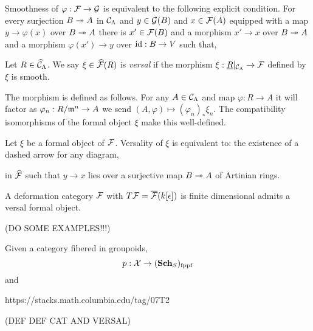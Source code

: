 \documentclass[12pt]{article}
\begin{document}
\begin{lemma}
Smoothness of $\varphi : \mathcal{F} \to \mathcal{G}$ is equivalent to the following explicit condition. For every surjection $B \twoheadrightarrow A$ in $\mathcal{C}_{\Lambda}$ and $y \in \mathcal{G}(B)$ and $x \in \mathcal{F}(A)$ equipped with a map $y \to \varphi(x)$ over $B \twoheadrightarrow A$ there is $x' \in \mathcal{F}(B)$ and a morphism $x' \to x$ over $B \twoheadrightarrow A$ and a morphism $\varphi(x') \to y$ over $\mathrm{id} : B \to V$ such that,
\begin{center}
\end{center}
\end{lemma}

\begin{defn}
Let $R \in \widehat{\mathcal{C}}_{\Lambda}$. We say $\xi \in \widehat{\mathcal{F}}(R)$ is \textit{versal} if the morphism $\xi : \underline{R}|_{\mathcal{C}_\Lambda} \to \mathcal{F}$ defined by $\xi$ is smooth.
\end{defn}

\begin{rmk}
The morphism is defined as follows. For any $A \in \mathcal{C}_{\Lambda}$ and map $\varphi : R \to A$ it will factor as $\varphi_n : R / \mathfrak{m}^n \to A$ we send $(A, \varphi) \mapsto (\varphi_n)_* \xi_n$. The compatibility isomorphisms of the formal object $\xi$ make this well-defined. 
\end{rmk}

\begin{rmk}
Let $\xi$ be a formal object of $\mathcal{F}$. Versality of $\xi$ is equivalent to: the existence of a dashed arrow for any diagram,
\begin{center}
\end{center}
in $\widehat{\mathcal{F}}$ such that $y \to x$ lies over a surjective map $B \twoheadrightarrow A$ of Artinian rings. 
\end{rmk}

\begin{theorem}
A deformation category $\mathcal{F}$ with $T \mathcal{F} = \overline{\mathcal{F}}(k[\epsilon])$ is finite dimensional admits a versal formal object.
\end{theorem}

(DO SOME EXAMPLES!!!)

\begin{defn}
Given a category fibered in groupoids,
\[ p : \mathcal{X} \to (\mathbf{Sch}_S)_{\mathrm{fppf}} \]
and 

https://stacks.math.columbia.edu/tag/07T2

(DEF DEF CAT AND VERSAL)
\end{defn}
\end{document}
